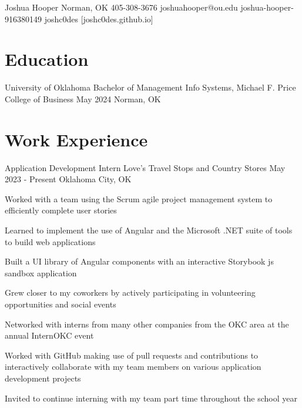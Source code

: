 \documentclass[letterpaper]{resumeconfig}
\begin{document}
\Header
    {Joshua Hooper} %
    {Norman, OK} %
    {405-308-3676} %
    {joshuahooper@ou.edu} %
    {joshua-hooper-916380149} %
    {joshc0des} %
    [joshc0des.github.io] %


\section{Education}

\Education
    {University of Oklahoma} %
    {Bachelor of Management Info Systems, Michael F. Price College of Business} %
    {May 2024} %
    {Norman, OK} %
    \vspace{-1em}


\section{Work Experience}

\WorkExperience
    {Application Development Intern} %
    {Love's Travel Stops and Country Stores} %
    {May 2023 - Present} %
    {Oklahoma City, OK} %
    {
        \item Worked with a team using the Scrum agile project management system to efficiently complete user stories
        \item Learned to implement the use of Angular and the Microsoft .NET suite of tools to build web applications
        \item Built a UI library of Angular components with an interactive Storybook js sandbox application
        \item Grew closer to my coworkers by actively participating in volunteering opportunities and social events
        \item Networked with interns from many other companies from the OKC area at the annual InternOKC event
        \item Worked with GitHub making use of pull requests and contributions to interactively collaborate with my team members on various application development projects
        \item Invited to continue interning with my team part time throughout the school year
    }
    \vspace{1em}
\end{document}
